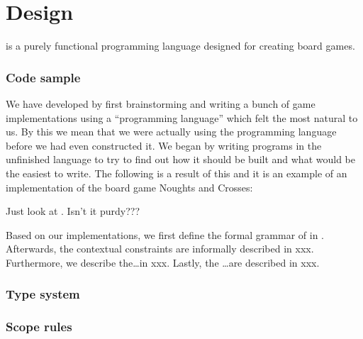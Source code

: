 \chapter{Design}
\label{chap:design}

\productname{} is a purely functional programming language designed for creating
board games.

\subsection*{Code sample}

We have developed \productname{} by first brainstorming and writing a bunch of
game implementations using a ``programming language'' which felt the most
natural to us. By this we mean that we were actually using the programming
language before we had even constructed it. We began by writing programs in the
unfinished language to try to find out how it should be built and what would be
the easiest to write. The following is a result of this and it is an example of an
implementation of the board game Noughts and Crosses:


Just look at . Isn't it purdy???


Based on our implementations, we first define the formal grammar of
\productname{} in . Afterwards, the contextual constraints
are informally described  in xxx. Furthermore, we describe the\dots in xxx. Lastly, the 
\ldots are described in xxx.

\subsection*{Type system}

\subsection*{Scope rules}








%
%
%
%
%
%
%
%
